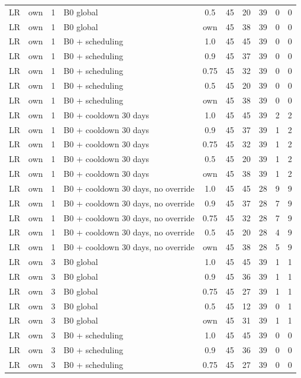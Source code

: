 \begin{longtable}{lllp{4.4cm}cccccc}
LR & own & 1 & B0 global & 0.5 & 45 & 20 & 39 & 0 & 0 \\
LR & own & 1 & B0 global & own & 45 & 38 & 39 & 0 & 0 \\
LR & own & 1 & B0 + scheduling & 1.0 & 45 & 45 & 39 & 0 & 0 \\
LR & own & 1 & B0 + scheduling & 0.9 & 45 & 37 & 39 & 0 & 0 \\
LR & own & 1 & B0 + scheduling & 0.75 & 45 & 32 & 39 & 0 & 0 \\
LR & own & 1 & B0 + scheduling & 0.5 & 45 & 20 & 39 & 0 & 0 \\
LR & own & 1 & B0 + scheduling & own & 45 & 38 & 39 & 0 & 0 \\
LR & own & 1 & B0 + cooldown 30 days & 1.0 & 45 & 45 & 39 & 2 & 2 \\
LR & own & 1 & B0 + cooldown 30 days & 0.9 & 45 & 37 & 39 & 1 & 2 \\
LR & own & 1 & B0 + cooldown 30 days & 0.75 & 45 & 32 & 39 & 1 & 2 \\
LR & own & 1 & B0 + cooldown 30 days & 0.5 & 45 & 20 & 39 & 1 & 2 \\
LR & own & 1 & B0 + cooldown 30 days & own & 45 & 38 & 39 & 1 & 2 \\
LR & own & 1 & B0 + cooldown 30 days, no override & 1.0 & 45 & 45 & 28 & 9 & 9 \\
LR & own & 1 & B0 + cooldown 30 days, no override & 0.9 & 45 & 37 & 28 & 7 & 9 \\
LR & own & 1 & B0 + cooldown 30 days, no override & 0.75 & 45 & 32 & 28 & 7 & 9 \\
LR & own & 1 & B0 + cooldown 30 days, no override & 0.5 & 45 & 20 & 28 & 4 & 9 \\
LR & own & 1 & B0 + cooldown 30 days, no override & own & 45 & 38 & 28 & 5 & 9 \\
LR & own & 3 & B0 global & 1.0 & 45 & 45 & 39 & 1 & 1 \\
LR & own & 3 & B0 global & 0.9 & 45 & 36 & 39 & 1 & 1 \\
LR & own & 3 & B0 global & 0.75 & 45 & 27 & 39 & 1 & 1 \\
LR & own & 3 & B0 global & 0.5 & 45 & 12 & 39 & 0 & 1 \\
LR & own & 3 & B0 global & own & 45 & 31 & 39 & 1 & 1 \\
LR & own & 3 & B0 + scheduling & 1.0 & 45 & 45 & 39 & 0 & 0 \\
LR & own & 3 & B0 + scheduling & 0.9 & 45 & 36 & 39 & 0 & 0 \\
LR & own & 3 & B0 + scheduling & 0.75 & 45 & 27 & 39 & 0 & 0 \\

\end{longtable}
